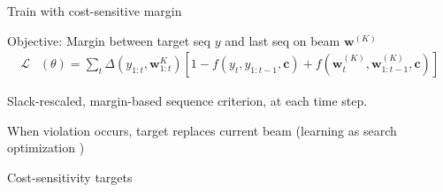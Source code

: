 \documentclass{beamer}
\let\tempone\itemize
\let\temptwo\enditemize
\renewenvironment{itemize}{\tempone\addtolength{\itemsep}{0.5\baselineskip}}{\temptwo}
\newcommand{\wvec}{\mathbf{w}}
\newcommand{\cvec}{\mathbf{c}}
\newcommand{\Cite}[1]{{\footnotesize \citep{#1}}}
\begin{document}
\begin{frame}
  \begin{center}
     Train with cost-sensitive margin  
  \end{center}

  Objective: Margin between target seq $y$ and last seq on beam $\wvec^{(K)}$  
\begin{align*}
 \mathcal{L}&(\theta) = \sum_{t} \Delta(y_{1:t}, \wvec_{1:t}^{K}) \left[1 - f(y_t, y_{1:t-1}, \cvec) +  f(\wvec_t^{(K)}, \wvec_{1:t-1}^{(K)}, \cvec) \right] 
\end{align*}

\begin{itemize}
  \item Slack-rescaled, margin-based sequence criterion, at each time step.  
\item When violation occurs, target replaces current beam (learning as search optimization \Cite{daume05learning})
  \item Cost-sensitivity targets 
  
\end{itemize}

\end{frame}
\end{document}
